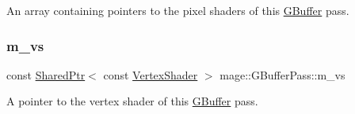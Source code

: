 An array containing pointers to the pixel shaders of this \hyperlink{structmage_1_1_g_buffer}{G\+Buffer} pass. \hypertarget{classmage_1_1_g_buffer_pass_a5baced2ca3d5018e35d25d6c1b5d8f20}{}\label{classmage_1_1_g_buffer_pass_a5baced2ca3d5018e35d25d6c1b5d8f20} 
\subsubsection{\texorpdfstring{m\+\_\+vs}{m\_vs}}
{\footnotesize\ttfamily const \hyperlink{namespacemage_a1e01ae66713838a7a67d30e44c67703e}{Shared\+Ptr}$<$ const \hyperlink{classmage_1_1_vertex_shader}{Vertex\+Shader} $>$ mage\+::\+G\+Buffer\+Pass\+::m\+\_\+vs\hspace{0.3cm}{\ttfamily [private]}}

A pointer to the vertex shader of this \hyperlink{structmage_1_1_g_buffer}{G\+Buffer} pass. 